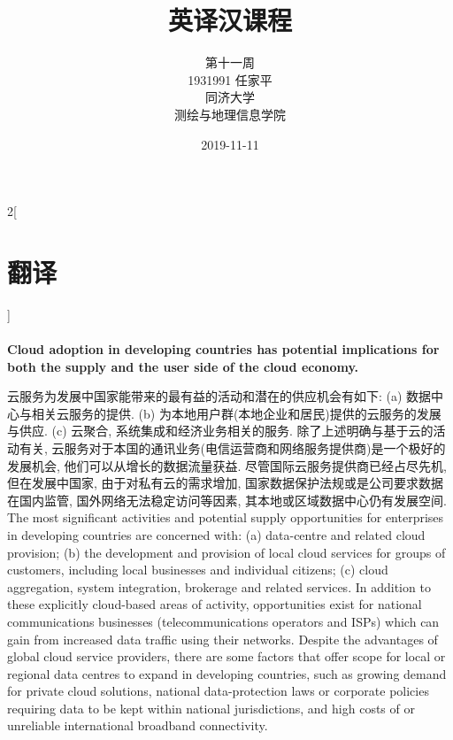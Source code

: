 \documentclass[a4paper, UTF8, 12pt]{article}
\begin{document}
\title{\Huge 英译汉课程}
\author{\Large 
        第十一周 \\[12pt]
        1931991 任家平 \\[12pt]
        同济大学 \\[12pt]
        测绘与地理信息学院}
\date{2019-11-11}

\maketitle

\thispagestyle{empty}

\newpage
{}
\tableofcontents
{}

\newpage
{}

\begin{paracol}{2}[\section{翻译}]

    \switchcolumn*
    \paragraph{} 
    \switchcolumn
    \paragraph{}
    {\bfseries Cloud adoption in developing countries has potential implications for both the supply and the user side of the cloud economy.} 
    
    \switchcolumn*
    云服务为发展中国家能带来的最有益的活动和潜在的供应机会有如下: (a) 数据中心与相关云服务的提供. (b) 为本地用户群(本地企业和居民)提供的云服务的发展与供应. (c) 云聚合, 系统集成和经济业务相关的服务. 除了上述明确与基于云的活动有关, 云服务对于本国的通讯业务(电信运营商和网络服务提供商)是一个极好的发展机会, 他们可以从增长的数据流量获益. 尽管国际云服务提供商已经占尽先机, 但在发展中国家, 由于对私有云的需求增加, 国家数据保护法规或是公司要求数据在国内监管, 国外网络无法稳定访问等因素, 其本地或区域数据中心仍有发展空间.
    \switchcolumn
    The most significant activities and potential supply opportunities for enterprises in developing countries are concerned with: (a) data-centre and related cloud provision; (b) the development and provision of local cloud services for groups of customers, including local businesses and individual citizens; (c) cloud aggregation, system integration, brokerage and related services. In addition to these explicitly cloud-based areas of activity, opportunities exist for national communications businesses (telecommunications operators and ISPs) which can gain from increased data traffic using their networks. Despite the advantages of global cloud service providers, there are some factors that offer scope for local or regional data centres to expand in developing countries, such as growing demand for private cloud solutions, national data-protection laws or corporate policies requiring data to be kept within national jurisdictions, and high costs of or unreliable international broadband connectivity. 


\end{paracol}
\end{document}
